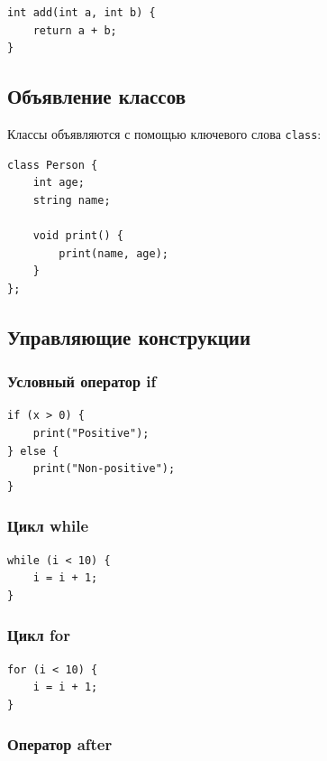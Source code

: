 \documentclass[12pt,a4paper]{article}
\begin{document}
\begin{lstlisting}
int add(int a, int b) {
    return a + b;
}
\end{lstlisting}

\subsection{Объявление классов}

Классы объявляются с помощью ключевого слова \texttt{class}:

\begin{lstlisting}
class Person {
    int age;
    string name;
    
    void print() {
        print(name, age);
    }
};
\end{lstlisting}

\subsection{Управляющие конструкции}

\subsubsection{Условный оператор if}

\begin{lstlisting}
if (x > 0) {
    print("Positive");
} else {
    print("Non-positive");
}
\end{lstlisting}

\subsubsection{Цикл while}

\begin{lstlisting}
while (i < 10) {
    i = i + 1;
}
\end{lstlisting}

\subsubsection{Цикл for}

\begin{lstlisting}
for (i < 10) {
    i = i + 1;
}
\end{lstlisting}

\subsubsection{Оператор after}
\end{document}
